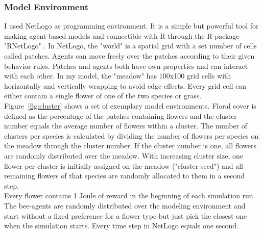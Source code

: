 \subsubsection*{Model Environment}
I used NetLogo \citep{wilensky1999netlogo} as programming environment. It is a simple but powerful tool for making agent-based models and connectible with R through the R-package "RNetLogo" \citep{thiele2014r}. In NetLogo, the "world" is a spatial grid with a set number of cells called patches. Agents can move freely over the patches according to their given behavior rules. Patches and agents both have own properties and can interact with each other. 
In my model, the "meadow" has 100x100 grid cells with horizontally and vertically wrapping to avoid edge effects. Every grid cell can either contain a single flower of one of the two species or grass. \\
Figure~\ref{fig:cluster} shows a set of exemplary model environments. Floral cover is defined as the percentage of the patches containing flowers and the cluster number equals the average number of flowers within a cluster. The number of clusters per species is calculated by dividing the number of flowers per species on the meadow through the cluster number. If the cluster number is one, all flowers are randomly distributed over the meadow. With increasing cluster size, one flower per cluster is initially assigned on the meadow ("cluster-seed") and all remaining flowers of that species are randomly allocated to them in a second step.\\
Every flower contains 1 Joule of reward in the beginning of each simulation run. The bee-agents are randomly distributed over the modeling environment and start without a fixed preference for a flower type but just pick the closest one when the simulation starts. Every time step in NetLogo equals one second. 


